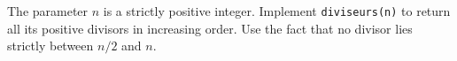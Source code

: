 The parameter $n$ is a strictly positive integer. Implement \texttt{diviseurs(n)} to return all its positive divisors in increasing order. Use the fact that no divisor lies strictly between $n/2$ and $n$.
